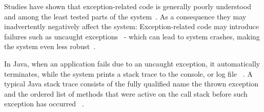 \documentclass[conference]{IEEEtran}
\begin{document}

Studies have shown that exception-related code is generally poorly understood and among the least tested parts of the system~\cite{miller1997issues,Robil00,shah2010understanding, 
garcia2007extracting,garcia2001comparative,cabral2007exception,coelho2011unveiling}.
As a consequence they may inadvertently negatively affect the system: Exception-related code may introduce failures such as 
uncaught exceptions~\cite{jo2004uncaught, Zhang12} - 
which can lead to system crashes, making the system even less robust~\cite{coelho2011unveiling}.

In Java, when an application fails due to an uncaught exception, 
it automatically terminates, while the system prints a stack trace to the console, 
or log file ~\cite{gosling2000java}.  A typical Java stack trace consists of  the fully qualified name 
the thrown exception and the ordered list of methods that were active on the call stack before 
such exception has occurred ~\cite{gosling2000java,bloch2008effective}.


\end{document}
